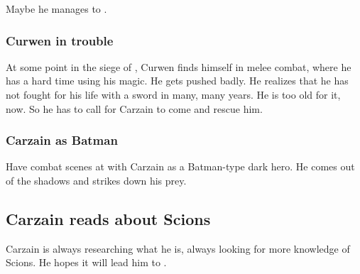 Maybe he manages to .





\subsubsection{Curwen in trouble}
At some point in the siege of \Forclin, Curwen finds himself in melee combat, where he has a hard time using his magic.
He gets pushed badly.
He realizes that he has not fought for his life with a sword in many, many years.
He is too old for it, now.
So he has to call for Carzain to come and rescue him.





\subsubsection{Carzain as Batman}
Have combat scenes at \Forclin with Carzain as a Batman-type dark hero. 
He comes out of the shadows and strikes down his prey. 










\subsection{Carzain reads about Scions}
Carzain is always researching what he is, always looking for more knowledge of Scions. 
He hopes it will lead him to \apotheosis. 


